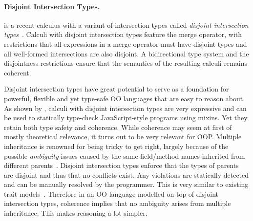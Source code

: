 \paragraph{Disjoint Intersection Types.}
\oname is a recent calculus with a variant of intersection types 
called \emph{disjoint intersection types}~\citep{oliveira2016disjoint}.
Calculi with disjoint intersection types feature the merge 
operator, with restrictions that all expressions in a merge 
operator must have disjoint types and all well-formed intersections 
are also disjoint. A bidirectional type system and the disjointness restrictions 
ensure that the semantics of the resulting calculi remains 
coherent. 

\begin{comment}
The merge operator was introduced by Reynolds 
and Forsythe and adopted by a few other calculi as well~\citep{}.
Unfortunately, while the merge operator is powerful, it makes 
it hard to get a \emph{coherent} semantics. \bruno{what is coherence}
Perhaps because 
of this issue the merge operator has not been adopted by 
many language designs. Disjoint intersection types provide 
a remedy for the coherence problem, by imposing restrictions 
on the uses of merges and on the formation of intersection types. 
\bruno{merge operator ==> models inheritance; intersection types ==> 
model subtyping}

In essence disjoint intersection types retain most of the 
expressive power of the merge operator.
For example, they can 
be used to model powerful forms of extensible records~\citep{}.
\end{comment}

Disjoint intersection types have great potential to serve as a foundation for
powerful, flexible and yet type-safe OO languages that are easy to reason
about. As shown by \citet{alpuimdisjoint}, calculi with disjoint intersection
types are very
expressive and can be used to statically type-check JavaScript-style programs
using mixins. Yet they retain both type safety and coherence. While
coherence may seem at first of mostly theoretical relevance, it
turns out to be very relevant for OOP. Multiple
inheritance is renowned for being tricky to get right, largely because of the
possible \emph{ambiguity} issues caused by the same field/method names
inherited from different parents~\citep{bracha1990mixin, scharli2003traits}. Disjoint intersection types
enforce that the types of parents are disjoint and thus that no conflicts exist.
Any violations are statically detected and can be manually resolved by the
programmer.
This is very similar
to existing trait models~\citep{fisher2004typed,
  ducasse2006traits}. Therefore in an OO language
modelled on top of disjoint intersection types, coherence implies
that no ambiguity arises from multiple inheritance. This makes
reasoning a lot simpler.

